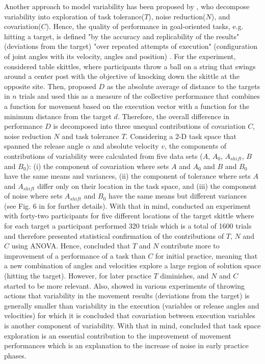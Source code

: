 Another approach to model variability has been proposed by \cite{muller2004},
who decompose variability into exploration of 
task tolerance($T$), noise reduction($N$), and covariation($C$).
Hence, the quality of performance in 
goal-oriented tasks, 
e.g. hitting a target, is defined "by the accuracy and replicability of the 
results" (deviations from the target) "over repeated attempts of execution" 
(configuration of joint angles with its velocity, angles and position)
\citep[p. 229]{muller2004}.
For the experiment, \cite{muller2004} considered table skittles, 
where participants throw a ball on a string that swings around 
a center post with the objective of knocking down the skittle at the 
opposite site.
Then, \cite{muller2004} proposed $D$ as the absolute average of distance to
the targets in $n$ trials and used this as a measure of the collective 
performance that combines a function for movement based on the 
execution vector with a function for the minimum distance from the target $d$.
Therefore, the overall difference in performance $D$ is decomposed
into three unequal contributions of covariation $C$, 
noise reduction $N$ and task tolerance $T$.
Considering a 2-D task space that spanned the release angle $\alpha$
and absolute velocity $v$, the components of contributions of
variability were calculated from five data sets 
($A$, $A_0$, $A_{shift}$, $B$ and $B_0$):
(i) the component of covariation where sets $A$ and $A_0$ and $B$ and $B_0$ 
have the same means and variances,
(ii) the component of tolerance where sets $A$ and $A_{shift}$ differ only on
their location in the task space, and 
(iii) the component of noise where sets $A_{shift}$ and $B_0$ have the same
means but different variances 
(see Fig. 6 in \cite{muller2004} for further details).
With that in mind, \cite{muller2004} conducted an experiment with 
forty-two participants for five different locations of the target 
skittle where for each target a participant performed 320 trials which is a 
total of 1600 trials and therefore presented statistical confirmation of the 
contributions of $T$, $N$ and $C$ using ANOVA. Hence, \cite{muller2004} 
concluded that $T$ and $N$ contribute more to improvement of a 
performance of a task than $C$ for initial practice, 
meaning that a new combination of angles and velocities explore a 
large region of solution space (hitting the target).
However, for later practice $T$ diminishes, and $N$ and $C$ started to 
be more relevant.
Also, \cite{muller2004} showed in various experiments of throwing actions
that variability in the movement results (deviations from the target) 
is generally smaller than variability in the execution
(variables or release angles and velocities) for which 
it is concluded that covariation between execution variables
is another component of variability.
With that in mind, \cite{muller2004} concluded that task space exploration 
is an essential  contribution to the improvement of movement performances
which is an explanation to the increase of noise in early practice phases.

